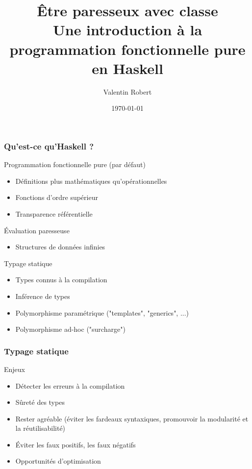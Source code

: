 \documentclass[10pt]{beamer}
\title[Haskell]{Être paresseux avec classe\\
Une introduction à la programmation fonctionnelle pure en Haskell}
\author{Valentin Robert}
\institute{INRIA}
\date{\today}
\begin{document}
\begin{frame}
\titlepage
\end{frame}



\begin{frame}
\frametitle{Qu'est-ce qu'Haskell ?}

\begin{block}
{Programmation fonctionnelle pure (par défaut)}
\begin{itemize}
\item Définitions plus mathématiques qu'opérationnelles
\item Fonctions d'ordre supérieur
\item Transparence référentielle
\end{itemize}
\end{block}

\pause

\begin{block}
{Évaluation paresseuse}
\begin{itemize}
\item Structures de données infinies
\end{itemize}
\end{block}

\pause

\begin{block}
{Typage statique}
\begin{itemize}
\item Types connus à la compilation
\item Inférence de types
\item Polymorphisme paramétrique ("templates", "generics", ...)
\item Polymorphisme ad-hoc ("surcharge")
\end{itemize}
\end{block}
\end{frame}



\begin{frame}
\frametitle{Typage statique}
\begin{block}
{Enjeux}
\begin{itemize}
\item Détecter les erreurs à la compilation
\item Sûreté des types
\item Rester agréable (éviter les fardeaux syntaxiques, promouvoir la
modularité et la réutilisabilité)
\item Éviter les faux positifs, les faux négatifs
\item Opportunités d'optimisation
\end{itemize}
\end{block}
\end{frame}
\end{document}
